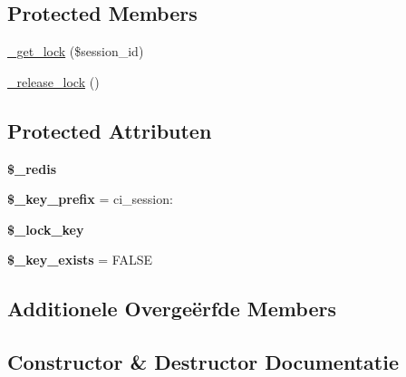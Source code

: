 \subsection*{Protected Members}
\begin{DoxyCompactItemize}
\item 
\mbox{\hyperlink{class_c_i___session__redis__driver_a2c49c8e23be3e2aca96a9d20de18ffc2}{\+\_\+get\+\_\+lock}} (\$session\+\_\+id)
\item 
\mbox{\hyperlink{class_c_i___session__redis__driver_a0265e356e6cf1eaba229663c1664c37d}{\+\_\+release\+\_\+lock}} ()
\end{DoxyCompactItemize}
\subsection*{Protected Attributen}
\begin{DoxyCompactItemize}
\item 
\mbox{\label{class_c_i___session__redis__driver_a36de60a8fcbe3efac91a87577d0728de}} 
{\bfseries \$\+\_\+redis}
\item 
\mbox{\label{class_c_i___session__redis__driver_a177f231cc2eec31d9aa8f50f9ec9b407}} 
{\bfseries \$\+\_\+key\+\_\+prefix} = \textquotesingle{}ci\+\_\+session\+:\textquotesingle{}
\item 
\mbox{\label{class_c_i___session__redis__driver_a79bf61cb0768c7bb23404280ae004fb4}} 
{\bfseries \$\+\_\+lock\+\_\+key}
\item 
\mbox{\label{class_c_i___session__redis__driver_ac440c17ec7ee39042a2f7665870957d3}} 
{\bfseries \$\+\_\+key\+\_\+exists} = F\+A\+L\+SE
\end{DoxyCompactItemize}
\subsection*{Additionele Overge\"{e}rfde Members}


\subsection{Constructor \& Destructor Documentatie}
\mbox{\label{class_c_i___session__redis__driver_ac1669c73d53d6f16cf5459a1e84d39c8}} 
